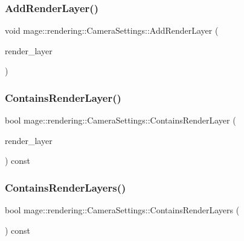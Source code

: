 \subsubsection{\texorpdfstring{Add\+Render\+Layer()}{AddRenderLayer()}}
{\footnotesize\ttfamily void mage\+::rendering\+::\+Camera\+Settings\+::\+Add\+Render\+Layer (\begin{DoxyParamCaption}\item[{\hyperlink{namespacemage_1_1rendering_a466c2a441ea5b26e4625c2f34e021b3d}{Render\+Layer}}]{render\+\_\+layer }\end{DoxyParamCaption})\hspace{0.3cm}{\ttfamily [noexcept]}}

\hypertarget{classmage_1_1rendering_1_1_camera_settings_aab59f8b20a5d05fd23fff006ef741dac}{}\label{classmage_1_1rendering_1_1_camera_settings_aab59f8b20a5d05fd23fff006ef741dac} 
\subsubsection{\texorpdfstring{Contains\+Render\+Layer()}{ContainsRenderLayer()}}
{\footnotesize\ttfamily bool mage\+::rendering\+::\+Camera\+Settings\+::\+Contains\+Render\+Layer (\begin{DoxyParamCaption}\item[{\hyperlink{namespacemage_1_1rendering_a466c2a441ea5b26e4625c2f34e021b3d}{Render\+Layer}}]{render\+\_\+layer }\end{DoxyParamCaption}) const\hspace{0.3cm}{\ttfamily [noexcept]}}

\hypertarget{classmage_1_1rendering_1_1_camera_settings_aa6a33e3b5936e440af32d2ca3d65585f}{}\label{classmage_1_1rendering_1_1_camera_settings_aa6a33e3b5936e440af32d2ca3d65585f} 
\subsubsection{\texorpdfstring{Contains\+Render\+Layers()}{ContainsRenderLayers()}}
{\footnotesize\ttfamily bool mage\+::rendering\+::\+Camera\+Settings\+::\+Contains\+Render\+Layers (\begin{DoxyParamCaption}{ }\end{DoxyParamCaption}) const\hspace{0.3cm}{\ttfamily [noexcept]}}

